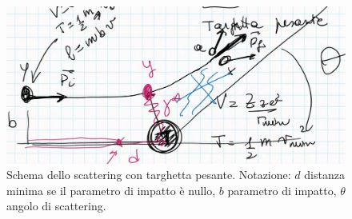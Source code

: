 \begin{figure}[h]
	\centering
	\includegraphics[scale=0.6]{Immagini/0419_schema.png}
	\caption{Schema dello scattering con targhetta pesante. Notazione: $d$ distanza minima se il parametro di impatto è nullo, $b$ parametro di impatto, $\theta$ angolo di scattering.}
	\label{0419_schema}
\end{figure}


